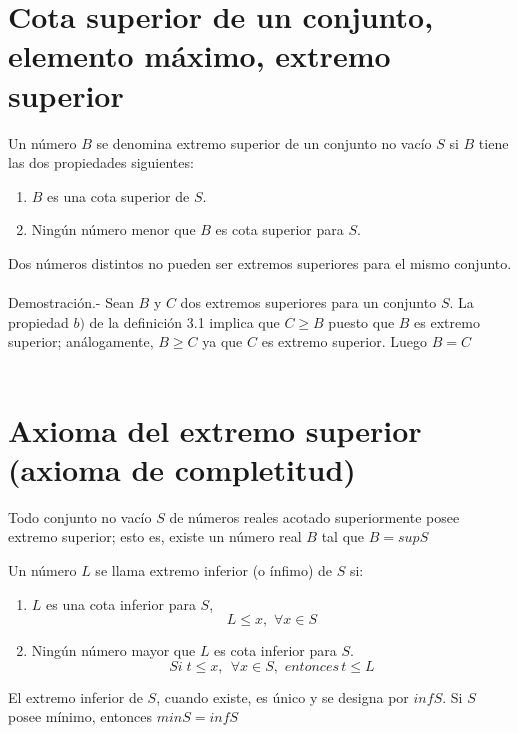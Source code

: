 \section{Cota superior de un conjunto, elemento máximo, extremo superior}
\begin{tcolorbox}[colframe=white]
\begin{def.}
Un número $B$ se denomina extremo superior de un conjunto no vacío $S$ si $B$ tiene las dos propiedades siguientes:
\begin{enumerate}[\bfseries a)]
\item $B$ es una cota superior de $S$.
\item Ningún número menor que $B$ es cota superior para $S$.
\end{enumerate}
\end{def.}
\end{tcolorbox}

\begin{teo}
Dos números distintos no pueden ser extremos superiores para el mismo conjunto.\\\\
Demostración.- \; Sean $B$ y $C$ dos extremos superiores para un conjunto $S$. La propiedad $b)$ de la definición 3.1 implica que $C\geq B$ puesto que $B$ es extremo superior; análogamente, $B \geq C$ ya que $C$ es extremo superior. Luego $B = C$ \\\\
\end{teo}

\section{Axioma del extremo superior (axioma de completitud)}

\begin{tcolorbox}[colframe=white]
\begin{axioma}
Todo conjunto no vacío $S$ de números reales acotado superiormente posee extremo superior; esto es, existe un número real $B$ tal que $B=sup S$
\end{axioma}
\end{tcolorbox}

\begin{tcolorbox}[colframe=white]
\begin{def.}
Un número $L$ se llama extremo inferior (o ínfimo) de $S$ si:
\begin{enumerate}[\bfseries a)]
\item $L$ es una cota inferior para $S$,
$$L\leq x, \, \, \forall x \in S$$
\item Ningún número mayor que $L$ es cota inferior para $S$.
$$Si \; t\leq x, \, \; \forall x \in S, \, \, entonces \, t\leq L $$
\end{enumerate}
El extremo inferior de $S$, cuando existe, es único y se designa por $infS$. Si $S$ posee mínimo, entonces $minS=infS$\\
\end{def.}
\end{tcolorbox}

